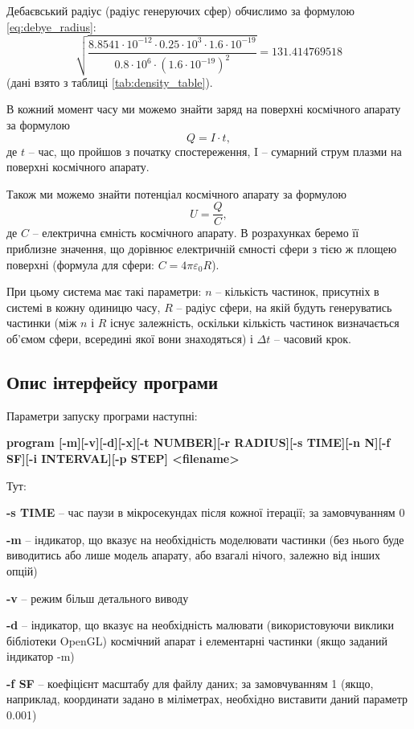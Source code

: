 \documentclass[a4paper,12pt]{article}
\begin{document}
Дебаєвський радіус (радіус генеруючих сфер) обчислимо за формулою \ref{eq:debye_radius}:
\[\sqrt{\frac{8.8541 \cdot 10^{-12} \cdot 0.25 \cdot 10^3 \cdot 1.6 \cdot 10^{-19}}{0.8 \cdot 10^6 \cdot (1.6 \cdot 10^{-19})^2}} = 131.414769518\]
(дані взято з таблиці \ref{tab:density_table}).

В кожний момент часу ми можемо знайти заряд на поверхні космічного апарату за формулою
\[Q = I \cdot t,\]
де $t$ -- час, що пройшов з початку спостереження, I -- сумарний струм плазми на поверхні космічного апарату.

Також ми можемо знайти потенціал космічного апарату за формулою
\[U = \frac{Q}{C},\]
де $C$ -- електрична ємність космічного апарату. В розрахунках беремо її приблизне значення, що дорівнює електричній ємності сфери з тією ж площею поверхні (формула для сфери: $C = 4 \pi \varepsilon_0 R$).


 При цьому система має такі параметри: $n$ -- кількість частинок, присутніх в системі в кожну одиницю часу, $R$ -- радіус сфери, на якій будуть генеруватись частинки (між $n$ і $R$ існує залежність, оскільки кількість частинок визначається об’ємом сфери, всередині якої вони знаходяться) і $\Delta t$ -- часовий крок.

\subsection{Опис інтерфейсу програми}
Параметри запуску програми наступні:

\textbf{program [-m][-v][-d][-x][-t NUMBER][-r RADIUS][-s TIME][-n N][-f SF][-i INTERVAL][-p STEP] <filename>}
    
    Тут:
    
    \textbf{-s TIME} -- час паузи в мікросекундах після кожної ітерації; за замовчуванням 0
    
    \textbf{-m} -- індикатор, що вказує на необхідність моделювати частинки (без нього буде виводитись або лише модель апарату, або взагалі нічого, залежно від інших опцій)
    
    \textbf{-v} -- режим більш детального виводу
    
    \textbf{-d} -- індикатор, що вказує на необхідність малювати (використовуючи виклики бібліотеки OpenGL) космічний апарат і елементарні частинки (якщо заданий індикатор -m)
    
    \textbf{-f SF} -- коефіцієнт масштабу для файлу даних; за замовчуванням 1 (якщо, наприклад, координати задано в міліметрах, необхідно виставити даний параметр 0.001)
    
\end{document}

